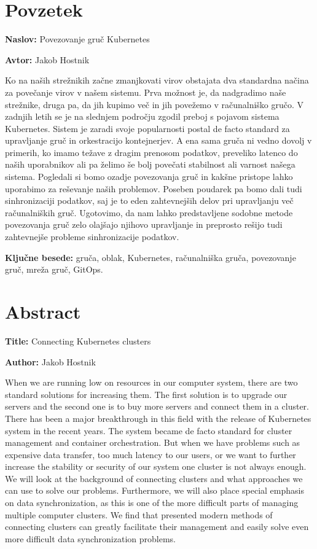 \documentclass[a4paper, 12pt]{book}
\newcommand{\ttitle}{Povezovanje gruč Kubernetes}
\newcommand{\ttitleEn}{Connecting Kubernetes clusters}
\newcommand{\tauthor}{Jakob Hostnik}
\newcommand{\tkeywords}{gruča, oblak, Kubernetes, računalniška gruča, povezovanje gruč, mreža gruč, GitOps}
\newcommand{\clearemptydoublepage}{\newpage{\pagestyle{empty}\cleardoublepage}}
\begin{document}
\chapter*{Povzetek}
\noindent\textbf{Naslov:} \ttitle
\bigskip

\noindent\textbf{Avtor:} \tauthor
\bigskip
\noindent 

Ko na naših strežnikih začne zmanjkovati virov obstajata dva standardna načina za povečanje virov v našem sistemu.
Prva možnost je, da nadgradimo naše strežnike, druga pa, da jih kupimo več in jih povežemo v računalniško gručo.
V zadnjih letih se je na slednjem področju zgodil preboj s pojavom sistema Kubernetes.
Sistem je zaradi svoje popularnosti postal de facto standard za upravljanje gruč in orkestracijo kontejnerjev.
A ena sama gruča ni vedno dovolj v primerih, ko imamo težave z dragim prenosom podatkov, preveliko latenco do naših uporabnikov ali pa želimo še bolj povečati stabilnost ali varnost našega sistema.
Pogledali si bomo ozadje povezovanja gruč in kakšne pristope lahko uporabimo za reševanje naših problemov.
Poseben poudarek pa bomo dali tudi sinhronizaciji podatkov, saj je to eden zahtevnejših delov pri upravljanju več računalniških gruč.
Ugotovimo, da nam lahko predstavljene sodobne metode povezovanja gruč zelo olajšajo njihovo upravljanje in preprosto rešijo tudi zahtevnejše probleme sinhronizacije podatkov.

\bigskip
\noindent\textbf{Ključne besede:} \tkeywords.
\clearemptydoublepage
\chapter*{Abstract}
\noindent\textbf{Title:} \ttitleEn
\bigskip

\noindent\textbf{Author:} \tauthor
\bigskip
\noindent 

When we are running low on resources in our computer system, there are two standard solutions for increasing them.
The first solution is to upgrade our servers and the second one is to buy more servers and connect them in a cluster.
There has been a major breakthrough in this field with the release of Kubernetes system in the recent years.
The system became de facto standard for cluster management and container orchestration.
But when we have problems such as expensive data transfer, too much latency to our users, or we want to further increase the stability or security of our system one cluster is not always enough.
We will look at the background of connecting clusters and what approaches we can use to solve our problems.
Furthermore, we will also place special emphasis on data synchronization, as this is one of the more difficult parts of managing multiple computer clusters.
We find that presented modern methods of connecting clusters can greatly facilitate their management and easily solve even more difficult data synchronization problems.
\end{document}
